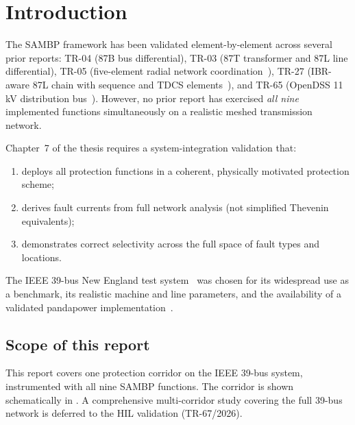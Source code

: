 \documentclass[12pt,a4paper]{article}
\begin{document}
\tableofcontents
\listoftables

\section{Introduction}
\label{sec:intro}

The SAMBP framework has been validated element-by-element across several
prior reports: TR-04 (87B bus differential), TR-03 (87T transformer and 87L
line differential), TR-05 (five-element radial network
coordination~\citep{SAMBP_TR05}), TR-27 (IBR-aware 87L chain with sequence
and TDCS elements~\citep{SAMBP_TR27}), and TR-65 (OpenDSS 11\,kV
distribution bus~\citep{SAMBP_TR65}).  However, no prior report has exercised
\emph{all nine} implemented functions simultaneously on a realistic
meshed transmission network.

Chapter~7 of the thesis requires a system-integration validation that:
\begin{enumerate}
  \item deploys all protection functions in a coherent, physically motivated
    protection scheme;
  \item derives fault currents from full network analysis (not simplified
    Thevenin equivalents);
  \item demonstrates correct selectivity across the full space of fault types
    and locations.
\end{enumerate}

The IEEE 39-bus New England test system~\citep{IEEE39bus} was chosen for its
widespread use as a benchmark, its realistic machine and line parameters, and
the availability of a validated pandapower implementation~\citep{pandapower}.

\subsection*{Scope of this report}

This report covers one protection corridor on the IEEE 39-bus system,
instrumented with all nine SAMBP functions.  The corridor is shown
schematically in .  A comprehensive multi-corridor
study covering the full 39-bus network is deferred to the HIL
validation (TR-67/2026).
\end{document}
